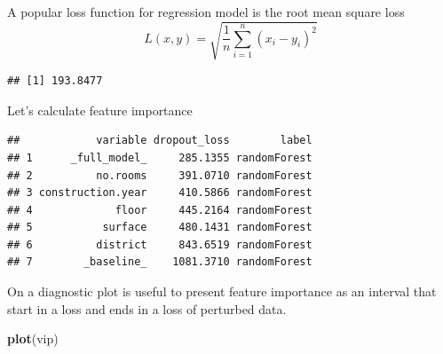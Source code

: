 \documentclass[12pt,]{krantz}
\newenvironment{Shaded}{\begin{snugshade}}{\end{snugshade}}
\newcommand{\DataTypeTok}[1]{\textcolor[rgb]{0.13,0.29,0.53}{#1}}
\newcommand{\DecValTok}[1]{\textcolor[rgb]{0.00,0.00,0.81}{#1}}
\newcommand{\KeywordTok}[1]{\textcolor[rgb]{0.13,0.29,0.53}{\textbf{#1}}}
\newcommand{\NormalTok}[1]{#1}
\newcommand{\OperatorTok}[1]{\textcolor[rgb]{0.81,0.36,0.00}{\textbf{#1}}}
\newcommand{\StringTok}[1]{\textcolor[rgb]{0.31,0.60,0.02}{#1}}
\theoremstyle{definition}
\theoremstyle{definition}
\theoremstyle{definition}
\theoremstyle{remark}
\begin{document}
A popular loss function for regression model is the root mean square
loss \[
  L(x, y) = \sqrt{\frac1n \sum_{i=1}^n (x_i - y_i)^2}
\]

\begin{Shaded}
\end{Shaded}

\begin{verbatim}
## [1] 193.8477
\end{verbatim}

Let's calculate feature importance

\begin{Shaded}
\end{Shaded}

\begin{verbatim}
##            variable dropout_loss        label
## 1      _full_model_     285.1355 randomForest
## 2          no.rooms     391.0710 randomForest
## 3 construction.year     410.5866 randomForest
## 4             floor     445.2164 randomForest
## 5           surface     480.1431 randomForest
## 6          district     843.6519 randomForest
## 7        _baseline_    1081.3710 randomForest
\end{verbatim}

On a diagnostic plot is useful to present feature importance as an
interval that start in a loss and ends in a loss of perturbed data.

\begin{Shaded}
\begin{Highlighting}[]
\KeywordTok{plot}\NormalTok{(vip)}
\end{Highlighting}
\end{Shaded}
\end{document}
